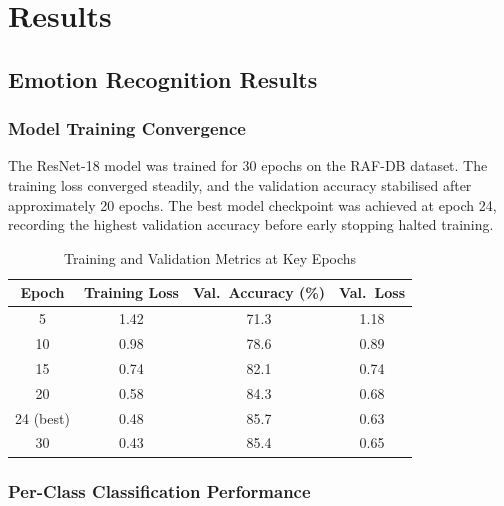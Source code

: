 \chapter{Results}


\section{Emotion Recognition Results}

\subsection{Model Training Convergence}

The ResNet-18 model was trained for 30 epochs on the RAF-DB dataset. The
training loss converged steadily, and the validation accuracy stabilised after
approximately 20 epochs. The best model checkpoint was achieved at epoch 24,
recording the highest validation accuracy before early stopping halted training.

\begin{table}[H]
\centering
\caption{Training and Validation Metrics at Key Epochs}
\begin{tabular}{cccc}
\toprule
\textbf{Epoch} & \textbf{Training Loss} & \textbf{Val.\ Accuracy (\%)} & \textbf{Val.\ Loss} \\
\midrule
5              & 1.42                   & 71.3                         & 1.18 \\
10             & 0.98                   & 78.6                         & 0.89 \\
15             & 0.74                   & 82.1                         & 0.74 \\
20             & 0.58                   & 84.3                         & 0.68 \\
24 (best)      & 0.48                   & 85.7                         & 0.63 \\
30             & 0.43                   & 85.4                         & 0.65 \\
\bottomrule
\end{tabular}
\end{table}

\subsection{Per-Class Classification Performance}

